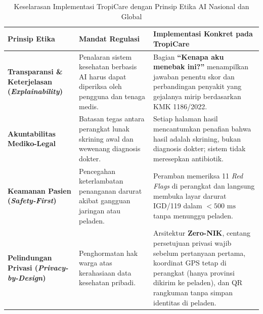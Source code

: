 \begin{table}[H]
\centering
\footnotesize
\caption{Keselarasan Implementasi TropiCare dengan Prinsip Etika AI Nasional dan Global}\label{tab:etika_ai}
\vspace{3pt}
\begin{tabularx}{\textwidth}{p{3.5cm} X X}
\toprule
\textbf{Prinsip Etika} & \textbf{Mandat Regulasi} & \textbf{Implementasi Konkret pada TropiCare} \\
\midrule
\textbf{Transparansi \& Keterjelasan (\textit{Explainability})} & Penalaran sistem kesehatan berbasis AI harus dapat diperiksa oleh pengguna dan tenaga medis. & Bagian \textbf{``Kenapa aku menebak ini?''} menampilkan jawaban penentu skor dan perbandingan penyakit yang gejalanya mirip berdasarkan KMK 1186/2022. \\
\midrule
\textbf{Akuntabilitas Mediko-Legal} & Batasan tegas antara perangkat lunak skrining awal dan wewenang diagnosis dokter. & Setiap halaman hasil mencantumkan penafian bahwa hasil adalah skrining, bukan diagnosis dokter; sistem tidak meresepkan antibiotik. \\
\midrule
\textbf{Keamanan Pasien (\textit{Safety-First})} & Pencegahan keterlambatan penanganan darurat akibat gangguan jaringan atau peladen. & Peramban memeriksa 11 \textit{Red Flags} di perangkat dan langsung membuka layar darurat IGD/119 dalam $<500\text{ ms}$ tanpa menunggu peladen. \\
\midrule
\textbf{Pelindungan Privasi (\textit{Privacy-by-Design})} & Penghormatan hak warga atas kerahasiaan data kesehatan pribadi. & Arsitektur \textbf{Zero-NIK}, centang persetujuan privasi wajib sebelum pertanyaan pertama, koordinat GPS tetap di perangkat (hanya provinsi dikirim ke peladen), dan QR rangkuman tanpa simpan identitas di peladen. \\
\bottomrule
\end{tabularx}
\end{table}
